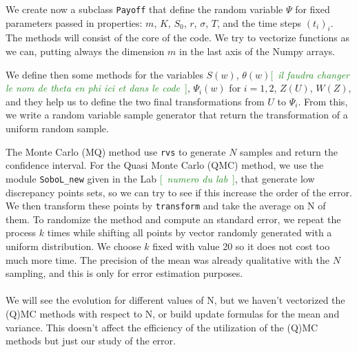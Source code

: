 \documentclass[a4paper]{article}
\theoremstyle{definition}
\theoremstyle{remark}
\newcommand{\s}{\sigma}
\newcommand{\com}[1]{\textcolor{ForestGreen}{[~\emph{#1}~]}}
\begin{document}
We create now a subclass \texttt{Payoff} that define the random variable $\Psi$ for fixed parameters passed in properties: $m$, $K$, $S_0$, $r$, $\s$, $T$, and the time steps $(t_i)_i$. The methods will consist of the core of the code. We try to vectorize functions as we can, putting always the dimension $m$ in the last axis of the Numpy arrays.

We define then some methods for the variables $S(w)$, $\theta(w)$\com{il faudra changer le nom de theta en phi ici et dans le code}, $\Psi_i(w)$ for $i=1,2$, $Z(U)$, $W(Z)$, and they help us to define the two final transformations from $U$ to $\Psi_i$. From this, we write a random variable sample generator that return the transformation of a uniform random sample.

The Monte Carlo (MQ) method use \texttt{rvs} to generate $N$ samples and return the confidence interval. For the Quasi Monte Carlo (QMC) method, we use the module \texttt{SoboL\_new} given in the Lab \com{numero du lab}, that generate low discrepancy points sets, so we can try to see if this increase the order of the error. We then transform these points by \texttt{transform} and take the average on N of them. To randomize the method and compute an standard error, we repeat the process $k$ times while shifting all points by vector randomly generated with a uniform distribution. We choose $k$ fixed with value 20 so it does not cost too much more time. The precision of the mean was already qualitative with the $N$ sampling, and this is only for error estimation purposes.
\\ \\
We will see the evolution for different values of N, but we haven't vectorized the (Q)MC methods with respect to N, or build update formulas for the mean and variance. This doesn't affect the efficiency of the utilization of the (Q)MC methods but just our study of the error.
\end{document}
